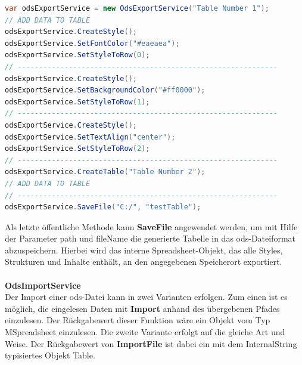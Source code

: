 \begin{lstlisting}[caption=Codebeispiel wie drei Zeilen einer Tabelle gestyled werden und eine weitere Tabelle hinzugefügt wird, language=Java]
var odsExportService = new OdsExportService("Table Number 1");
// ADD DATA TO TABLE
odsExportService.CreateStyle();
odsExportService.SetFontColor("#eaeaea");
odsExportService.SetStyleToRow(0);
// -------------------------------------------------------------
odsExportService.CreateStyle();
odsExportService.SetBackgroundColor("#ff0000");
odsExportService.SetStyleToRow(1);
// -------------------------------------------------------------
odsExportService.CreateStyle();
odsExportService.SetTextAlign("center");
odsExportService.SetStyleToRow(2);
// -------------------------------------------------------------
odsExportService.CreateTable("Table Number 2");
// ADD DATA TO TABLE
// -------------------------------------------------------------
odsExportService.SaveFile("C:/", "testTable");
\end{lstlisting}
Als letzte öffentliche Methode kann \textbf{SaveFile} angewendet werden, um mit Hilfe der Parameter {\frqq}path{\flqq} und {\frqq}fileName{\flqq} die generierte Tabelle in das ods-Dateiformat abzuspeichern. Hierbei wird das interne Spreadsheet-Objekt, das alle Styles, Strukturen und Inhalte enthält, an den angegebenen Speicherort exportiert.\\\\
\textbf{OdsImportService}\\
Der Import einer ods-Datei kann in zwei Varianten erfolgen. Zum einen ist es möglich, die eingelesen Daten mit \textbf{Import} anhand des übergebenen Pfades einzulesen. Der Rückgabewert dieser Funktion wäre ein Objekt vom Typ MSpreadsheet einzulesen. Die zweite Variante erfolgt auf die gleiche Art und Weise. Der Rückgabewert von \textbf{ImportFile} ist dabei ein mit dem InternalString typisiertes Objekt Table.

